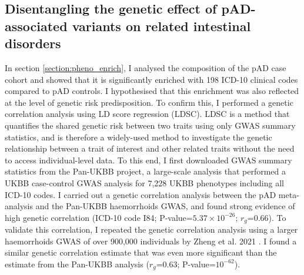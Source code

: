       
    
 

  \subsection{Disentangling the genetic effect of pAD-associated variants on related intestinal disorders}

  In section \ref{section:pheno_enrich}, I analysed the composition of the pAD case cohort and showed that it is significantly enriched with 198 ICD-10 clinical codes compared to pAD controls. I hypothesised that this enrichment was also reflected at the level of genetic risk predisposition. To confirm this, I performed a genetic correlation analysis using LD score regression (LDSC). LDSC is a method that quantifies the shared genetic risk between two traits using only GWAS summary statistics, and is therefore a widely-used method to investigate the genetic relationship between a trait of interest and other related traits without the need to access individual-level data. To this end, I first downloaded GWAS summary statistics from the Pan-UKBB project, a large-scale analysis that performed a UKBB case-control GWAS analysis for 7,228 UKBB phenotypes including all ICD-10 codes. I carried out a genetic correlation analysis between the pAD meta-analysis and the Pan-UKBB haemorrhoids GWAS, and found strong evidence of high genetic correlation (ICD-10 code I84; P-value=$5.37\times10^{-26}$; $r_{g}$=0.66). To validate this correlation, I repeated the genetic correlation analysis using a larger haemorrhoids GWAS of over 900,000 individuals by Zheng et al. 2021 \cite{Zheng2021-ss}. I found a similar genetic correlation estimate that was even more significant than the estimate from the Pan-UKBB analysis ($r_{g}$=0.63; P-value=$10^{-62}$).
  


